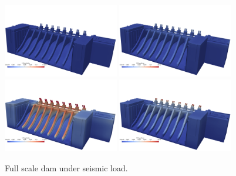 \documentclass{report}
\begin{document}
\begin{figure}
    \centering
    \includegraphics[width=0.45\textwidth]{./Images/dam1.png}    \includegraphics[width=0.45\textwidth]{./Images/dam2.png}\\
    \includegraphics[width=0.45\textwidth]{./Images/dam3.png}
    \includegraphics[width=0.45\textwidth]{./Images/dam4.png}
    \caption{Full scale dam under seismic load.}
    \label{fig:dam}
\end{figure}
\end{document}
